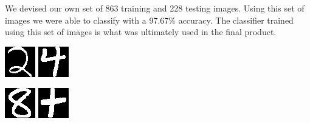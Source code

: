 We devised our own set of 863 training and 228 testing images. Using this set of images we were able to classify with a 97.67\% accuracy. The classifier trained using this set of images is what was ultimately used in the final product.

\begin{center}
\begin{minipage}[h!]{.9\linewidth}%
\begin{minipage}[h!]{.9\linewidth}%
\begin{center}
\includegraphics[width=.3\textwidth]{images/2.png}
\includegraphics[width=.3\linewidth]{images/4.png}
\end{center}
\end{minipage}
\vfill
\vspace{1 mm}
\begin{minipage}[h!]{0.9\textwidth}%
\begin{center}
\includegraphics[width=.3\textwidth]{images/8.png}
\includegraphics[width=.3\linewidth]{images/p.png}
\end{center}
\end{minipage}
\vspace{5 mm}
\end{minipage}
\end{center}
